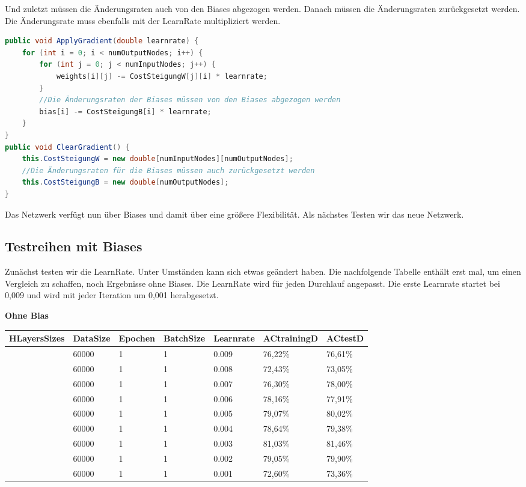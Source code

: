 \documentclass[12pt]{article}
\begin{document}
Und zuletzt  müssen die Änderungsraten auch von den Biases abgezogen werden. Danach müssen die Änderungsraten zurückgesetzt werden. Die Änderungsrate muss ebenfalls mit der LearnRate multipliziert werden.
\begin{lstlisting}[language=Java]
public void ApplyGradient(double learnrate) {
    for (int i = 0; i < numOutputNodes; i++) {
        for (int j = 0; j < numInputNodes; j++) {
            weights[i][j] -= CostSteigungW[j][i] * learnrate;
        }
        //Die Änderungsraten der Biases müssen von den Biases abgezogen werden
        bias[i] -= CostSteigungB[i] * learnrate;
    }
}
public void ClearGradient() {
    this.CostSteigungW = new double[numInputNodes][numOutputNodes];
    //Die Änderungsraten für die Biases müssen auch zurückgesetzt werden
    this.CostSteigungB = new double[numOutputNodes];
}
\end{lstlisting}
Das Netzwerk verfügt nun über Biases und damit über eine größere Flexibilität. Als nächstes Testen wir das neue Netzwerk.
\subsection{Testreihen mit Biases}
Zunächst testen wir die LearnRate. Unter Umständen kann sich etwas geändert haben.
Die nachfolgende Tabelle enthält erst mal, um einen Vergleich zu schaffen, noch Ergebnisse ohne Biases. Die LearnRate wird für jeden Durchlauf angepasst. Die erste Learnrate startet bei 0,009 und wird mit jeder Iteration um 0,001 herabgesetzt.

\begin{table}[H]
    \centering
    \textbf{Ohne Bias}
    \begin{tabular}{|l|l|l|l|l|l|l|}
    \hline
        HLayersSizes & DataSize & Epochen & BatchSize & Learnrate & ACtrainingD & ACtestD \\ \hline
        [784, 100, 10] & 60000 & 1 & 1 & 0.009 & 76,22\% & 76,61\% \\ \hline
        [784, 100, 10] & 60000 & 1 & 1 & 0.008 & 72,43\% & 73,05\% \\ \hline
        [784, 100, 10] & 60000 & 1 & 1 & 0.007 & 76,30\% & 78,00\% \\ \hline
        [784, 100, 10] & 60000 & 1 & 1 & 0.006 & 78,16\% & 77,91\% \\ \hline
        [784, 100, 10] & 60000 & 1 & 1 & 0.005 & 79,07\% & 80,02\% \\ \hline
        [784, 100, 10] & 60000 & 1 & 1 & 0.004 & 78,64\% & 79,38\% \\ \hline
        [784, 100, 10] & 60000 & 1 & 1 & 0.003 & 81,03\% & 81,46\% \\ \hline
        [784, 100, 10] & 60000 & 1 & 1 & 0.002 & 79,05\% & 79,90\% \\ \hline
        [784, 100, 10] & 60000 & 1 & 1 & 0.001 & 72,60\% & 73,36\% \\ \hline
    \end{tabular}
\end{table}
\end{document}

